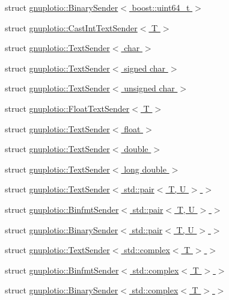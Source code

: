 \begin{DoxyCompactItemize}
\item 
struct \hyperlink{structgnuplotio_1_1_binary_sender_3_01boost_1_1uint64__t_01_4}{gnuplotio\+::\+Binary\+Sender$<$ boost\+::uint64\+\_\+t $>$}
\item 
struct \hyperlink{structgnuplotio_1_1_cast_int_text_sender}{gnuplotio\+::\+Cast\+Int\+Text\+Sender$<$ T $>$}
\item 
struct \hyperlink{structgnuplotio_1_1_text_sender_3_01char_01_4}{gnuplotio\+::\+Text\+Sender$<$ char $>$}
\item 
struct \hyperlink{structgnuplotio_1_1_text_sender_3_01signed_01char_01_4}{gnuplotio\+::\+Text\+Sender$<$ signed char $>$}
\item 
struct \hyperlink{structgnuplotio_1_1_text_sender_3_01unsigned_01char_01_4}{gnuplotio\+::\+Text\+Sender$<$ unsigned char $>$}
\item 
struct \hyperlink{structgnuplotio_1_1_float_text_sender}{gnuplotio\+::\+Float\+Text\+Sender$<$ T $>$}
\item 
struct \hyperlink{structgnuplotio_1_1_text_sender_3_01float_01_4}{gnuplotio\+::\+Text\+Sender$<$ float $>$}
\item 
struct \hyperlink{structgnuplotio_1_1_text_sender_3_01double_01_4}{gnuplotio\+::\+Text\+Sender$<$ double $>$}
\item 
struct \hyperlink{structgnuplotio_1_1_text_sender_3_01long_01double_01_4}{gnuplotio\+::\+Text\+Sender$<$ long double $>$}
\item 
struct \hyperlink{structgnuplotio_1_1_text_sender_3_01std_1_1pair_3_01_t_00_01_u_01_4_01_4}{gnuplotio\+::\+Text\+Sender$<$ std\+::pair$<$ T, U $>$ $>$}
\item 
struct \hyperlink{structgnuplotio_1_1_binfmt_sender_3_01std_1_1pair_3_01_t_00_01_u_01_4_01_4}{gnuplotio\+::\+Binfmt\+Sender$<$ std\+::pair$<$ T, U $>$ $>$}
\item 
struct \hyperlink{structgnuplotio_1_1_binary_sender_3_01std_1_1pair_3_01_t_00_01_u_01_4_01_4}{gnuplotio\+::\+Binary\+Sender$<$ std\+::pair$<$ T, U $>$ $>$}
\item 
struct \hyperlink{structgnuplotio_1_1_text_sender_3_01std_1_1complex_3_01_t_01_4_01_4}{gnuplotio\+::\+Text\+Sender$<$ std\+::complex$<$ T $>$ $>$}
\item 
struct \hyperlink{structgnuplotio_1_1_binfmt_sender_3_01std_1_1complex_3_01_t_01_4_01_4}{gnuplotio\+::\+Binfmt\+Sender$<$ std\+::complex$<$ T $>$ $>$}
\item 
struct \hyperlink{structgnuplotio_1_1_binary_sender_3_01std_1_1complex_3_01_t_01_4_01_4}{gnuplotio\+::\+Binary\+Sender$<$ std\+::complex$<$ T $>$ $>$}

\end{DoxyCompactItemize}
